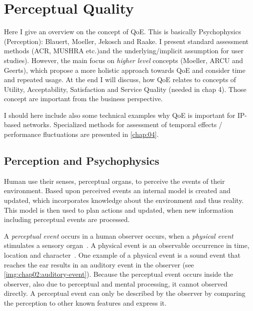 \chapter{Perceptual Quality}\label{chap:02}
\begin{chapter-abstract}
Here I give an overview on the concept of \ac{QoE}.
This is basically Psychophysics (Perception): Blauert, Moeller, Jekosch and Raake.
I present standard assessment methods (\ac{ACR}, \ac{MUSHRA} etc.)and the underlying/implicit assumption for user studies).
However, the main focus on \textit{higher level} concepts (Moeller, ARCU and Geerts), which propose a more holistic approach towards \ac{QoE} and consider time and repeated usage.
At the end I will discuss, how \ac{QoE} relates to concepts of Utility, Acceptability, Satisfaction and Service Quality (needed in chap 4).
Those concept are important from the business perspective.

I should here include also some technical examples why \ac{QoE} is important for \ac{IP}-based networks.
Specialized methods for assessment of temporal effects / performance fluctuations are presented in \autoref{chap:04}.
\end{chapter-abstract}

\section{Perception and Psychophysics}
Human use their senses, \ie perceptual organs, to perceive the events of their environment.
Based upon perceived events an internal model is created and updated, which incorporates knowledge about the environment and thus reality.
This model is then used to plan actions and updated, when new information including perceptual events are processed.

A \emph{perceptual event} occurs in a human observer occurs, when a \emph{physical event} stimulates a sensory organ~\cite{blauert_spatial_1996}.
A physical event is an observable occurrence in time, location and character~\cite{callet_qualinet_2013}.
One example of a physical event is a sound event that reaches the ear results in an auditory event in the observer (see \autoref{img:chap02:auditory-event}).
Because the perceptual event occurs inside the observer, also due to perceptual and mental processing, it cannot observed directly.
A perceptual event can only be described by the observer by comparing the perception to other known features and express it.

